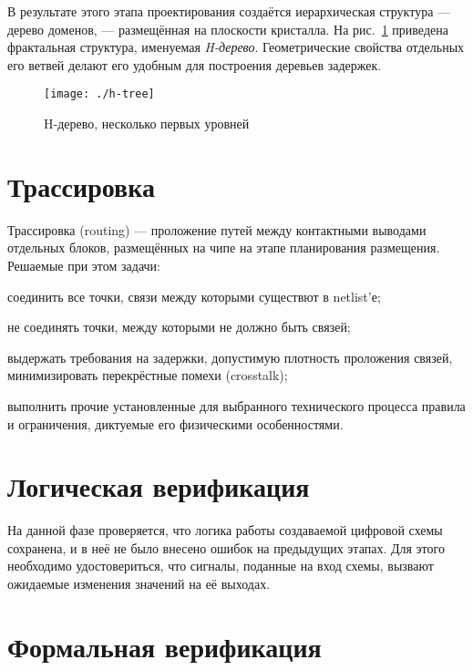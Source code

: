 В результате этого этапа проектирования создаётся иерархическая структура — дерево доменов, — размещённая на плоскости кристалла. На рис.~\ref{fig:htree} приведена фрактальная структура, именуемая \textit{H-дерево}. Геометрические свойства отдельных его ветвей делают его удобным для построения деревьев задержек.

\begin{figure}[htbp]
    \centering
    \texttt{[image: ./h-tree]}
    \caption{H-дерево, несколько первых уровней}
    \label{fig:htree}
\end{figure}

\section{Трассировка}\label{trace}

Трассировка (\abbr routing) — проложение путей между контактными выводами отдельных блоков, размещённых на чипе на этапе планирования размещения. Решаемые при этом задачи:
\begin{itemize*}
    \item соединить все точки, связи между которыми существют в netlist'е;
    \item не соединять точки, между которыми не должно быть связей;
    \item выдержать требования на задержки, допустимую плотность проложения связей, минимизировать перекрёстные помехи (\abbr crosstalk);
    \item выполнить прочие установленные для выбранного технического процесса правила и ограничения, диктуемые его физическими особенностями.
\end{itemize*}

\section{Логическая верификация}\label{logicverif}

На данной фазе проверяется, что логика работы создаваемой цифровой схемы сохранена, и в неё не было внесено ошибок на предыдущих этапах. Для этого необходимо удостовериться, что сигналы, поданные на вход схемы, вызвают ожидаемые изменения значений на её выходах.

\section{Формальная верификация}

